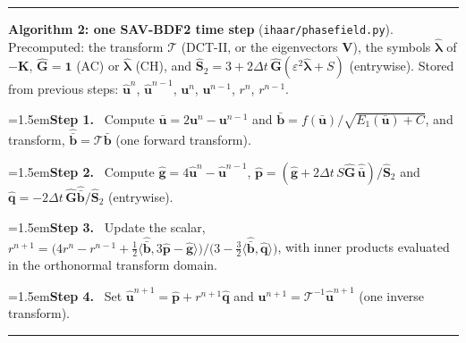 \documentclass[preprint,12pt]{elsarticle}
\theoremstyle{remark}
\newcommand{\step}[1]{\par\noindent\hangindent=1.5em\hangafter=1\textbf{Step #1.}\ }
\begin{document}
\begin{algorithm}[t]\small\hrule\smallskip
\noindent\textbf{Algorithm 2: one SAV-BDF2 time step} (\texttt{ihaar/phasefield.py}).
Precomputed: the transform $\mathcal T$ (DCT-II, or the eigenvectors $\mathbf V$), the symbols $\hat{\boldsymbol\lambda}$ of
$-\mathbf K$, $\hat{\mathbf G}=\mathbf 1$ (AC) or $\hat{\boldsymbol\lambda}$ (CH), and $\hat{\mathbf S}_2=3+2\Delta t\,\hat{\mathbf G}(\varepsilon^2\hat{\boldsymbol\lambda}+S)$ (entrywise).
Stored from previous steps: $\hat{\mathbf u}^n$, $\hat{\mathbf u}^{n-1}$, $\mathbf u^n$, $\mathbf u^{n-1}$, $r^n$, $r^{n-1}$.
\step{1} Compute $\bar{\mathbf u}=2\mathbf u^n-\mathbf u^{n-1}$ and $\bar{\mathbf b}=f(\bar{\mathbf u})/\sqrt{E_1(\bar{\mathbf u})+C}$, and transform, $\hat{\bar{\mathbf b}}=\mathcal T\bar{\mathbf b}$ (one forward transform).
\step{2} Compute $\hat{\mathbf g}=4\hat{\mathbf u}^n-\hat{\mathbf u}^{n-1}$, $\hat{\mathbf p}=(\hat{\mathbf g}+2\Delta t\,S\hat{\mathbf G}\,\hat{\bar{\mathbf u}})/\hat{\mathbf S}_2$ and $\hat{\mathbf q}=-2\Delta t\,\hat{\mathbf G}\hat{\bar{\mathbf b}}/\hat{\mathbf S}_2$ (entrywise).
\step{3} Update the scalar, $r^{n+1}=\big(4r^n-r^{n-1}+\tfrac12\langle\hat{\bar{\mathbf b}},3\hat{\mathbf p}-\hat{\mathbf g}\rangle\big)/\big(3-\tfrac32\langle\hat{\bar{\mathbf b}},\hat{\mathbf q}\rangle\big)$, with inner products evaluated in the orthonormal transform domain.
\step{4} Set $\hat{\mathbf u}^{n+1}=\hat{\mathbf p}+r^{n+1}\hat{\mathbf q}$ and $\mathbf u^{n+1}=\mathcal T^{-1}\hat{\mathbf u}^{n+1}$ (one inverse transform).
\smallskip\hrule
\end{algorithm}
\end{document}
